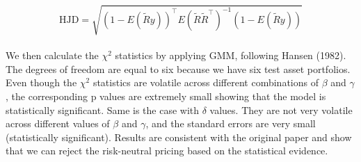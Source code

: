 \documentclass[11pt]{article}
\begin{document}
\begin{equation}
\mathrm{HJD}=\sqrt{(1-E(\tilde{R} y))^{\top} E\left(\tilde{R} \tilde{R}^{\top}\right)^{-1}(1-E(\tilde{R} y))}
\end{equation}

 \paragraph{} We then calculate the $\chi^{2}$ statistics by applying GMM, following Hansen (1982). The degrees of freedom are equal to six because we have six test asset portfolios. Even though the $\chi^{2}$ statistics are volatile across different combinations of $\beta$ and $\gamma$, the corresponding p values are extremely small showing that the model is statistically significant. Same is the case with $\delta$ values. They are not very volatile across different values of $\beta$ and $\gamma$, and the standard errors are very small (statistically significant). Results are consistent with the original paper and show that we can reject the risk-neutral pricing based on the statistical evidence. 
\end{document}

